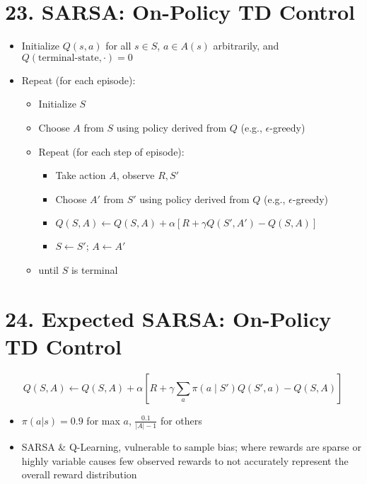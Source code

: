 \documentclass[letterpaper,10pt]{article}
\begin{document}
\begin{multicols}{2}
\section*{23. SARSA: On-Policy TD Control}
\begin{itemize}
    \item Initialize \( Q(s,a) \) for all \( s \in S \), \( a \in A(s) \) arbitrarily, and \( Q(\text{terminal-state}, \cdot) = 0 \)
    \item Repeat (for each episode):
    \begin{itemize}
        \item Initialize \( S \)
        \item Choose \( A \) from \( S \) using policy derived from \( Q \) (e.g., \(\epsilon\)-greedy)
        \item Repeat (for each step of episode):
        \begin{itemize}
            \item Take action \( A \), observe \( R, S' \)
            \item Choose \( A' \) from \( S' \) using policy derived from \( Q \) (e.g., \(\epsilon\)-greedy)
            \item \( Q(S,A) \leftarrow Q(S,A) + \alpha [R + \gamma Q(S', A') - Q(S,A)] \)
            \item \( S \leftarrow S' \); \( A \leftarrow A' \)
        \end{itemize}
        \item until \( S \) is terminal
    \end{itemize}
\end{itemize}

\section*{24. Expected SARSA: On-Policy TD Control}
\[
Q(S, A) \leftarrow Q(S, A) + \alpha \left[ R + 
\gamma \sum_a \pi(a \mid S') Q(S', a) - Q(S, A) \right]
\]
\begin{itemize}
    \item \( \pi(a|s) = 0.9\) for max \(a\), \(\frac{0.1}{|A|-1}\) for others
    \item SARSA \& Q-Learning, vulnerable to sample bias; where rewards are sparse or highly variable causes few observed rewards to not accurately represent the overall reward distribution
\end{itemize}


\end{multicols}
\end{document}
